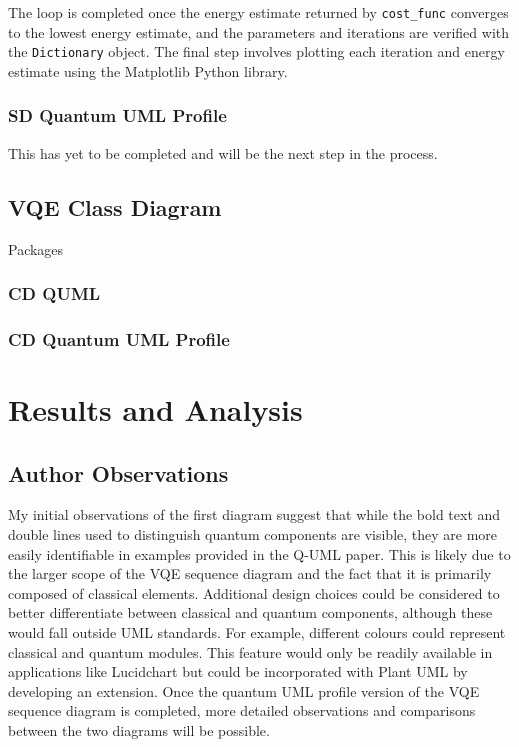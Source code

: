 \documentclass{article}
\begin{document}
The loop is completed once the energy estimate returned by \texttt{cost\_func} converges to the lowest energy estimate, and the parameters and iterations are verified with the \texttt{Dictionary} object. The final step involves plotting each iteration and energy estimate using the Matplotlib Python library.

\subsubsection{SD Quantum UML Profile}

This has yet to be completed and will be the next step in the process.

\subsection{VQE Class Diagram}

Packages


\subsubsection{CD QUML}
\subsubsection{CD Quantum UML Profile}

\section{Results and Analysis}

\subsection{Author Observations}

My initial observations of the first diagram suggest that while the bold text and double lines used to distinguish quantum components are visible, they are more easily identifiable in examples provided in the Q-UML paper. This is likely due to the larger scope of the VQE sequence diagram and the fact that it is primarily composed of classical elements.
Additional design choices could be considered to better differentiate between classical and quantum components, although these would fall outside UML standards. For example, different colours could represent classical and quantum modules. This feature would only be readily available in applications like Lucidchart but could be incorporated with Plant UML by developing an extension.
Once the quantum UML profile version of the VQE sequence diagram is completed, more detailed observations and comparisons between the two diagrams will be possible.
\end{document}
